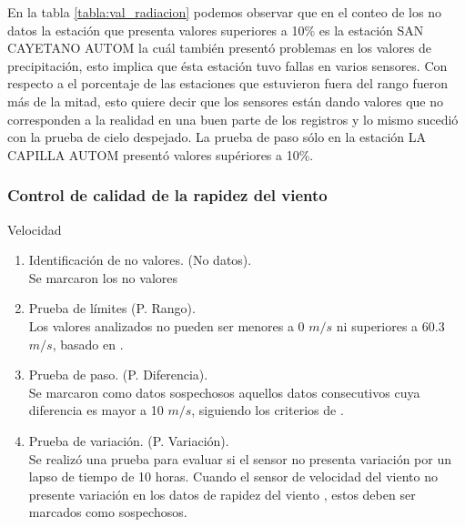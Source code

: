 En la tabla \ref{tabla:val_radiacion} podemos observar que en el conteo de los no datos la estación que presenta valores superiores a 10\% es la estación SAN CAYETANO AUTOM la cuál también presentó problemas en los valores de precipitación, esto implica que ésta estación tuvo fallas en varios sensores. Con respecto a el porcentaje de las estaciones que estuvieron fuera del rango fueron más de la mitad, esto quiere decir que los sensores están dando valores que no corresponden a la realidad en una buen parte de los registros y lo mismo sucedió con la prueba de cielo despejado. La prueba de paso sólo en la estación LA CAPILLA AUTOM presentó valores supériores a 10\%.

\subsubsection{Control de calidad de la rapidez del viento}

Velocidad

\begin{enumerate}
\item Identificación de no valores. (No datos).\\
Se marcaron los no valores

\item Prueba de límites (P. Rango).\\
Los valores analizados no pueden ser menores a 0 $m/s$ ni superiores a 60.3 $m/s$, basado en \citet{estevez2011}.

\item Prueba de paso. (P. Diferencia).\\
Se marcaron como datos sospechosos aquellos datos consecutivos cuya diferencia es mayor a 10 $m/s$, siguiendo los criterios de \citet{estevez2011}.

\item Prueba de variación. (P. Variación).\\

Se realizó una prueba para evaluar si el sensor no presenta variación por un lapso de tiempo de 10 horas. Cuando el sensor de velocidad del viento no presente variación en los datos de rapidez del viento , estos deben ser marcados como sospechosos.

\end{enumerate}

